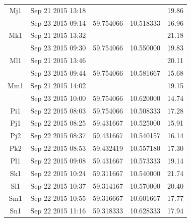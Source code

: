 \documentclass[12pt,a4paper,english]{article}
\begin{document}
\begin{table}[tb]
{\begin{tabular}{|c|c|c|c|c|}
Mj1 & Sep 21 2015 13:18 &           &           & 19.86 \vspace{-0.2cm} \\ 
    & Sep 23 2015 09:14 & 59.754066 & 10.518333 & 16.96\\ \hline
Mk1 & Sep 21 2015 13:32 &           &           & 21.18 \vspace{-0.2cm} \\ 
    & Sep 23 2015 09:30 & 59.754066 & 10.550000 & 19.83\\ \hline
Ml1 & Sep 21 2015 13:46 &           &           & 20.11 \vspace{-0.2cm} \\ 
    & Sep 23 2015 09:44 & 59.754066 & 10.581667 & 15.68\\ \hline
Mm1 & Sep 21 2015 14:02 &           &           & 19.15 \vspace{-0.2cm} \\ 
    & Sep 23 2015 10:00 & 59.754066 & 10.620000 & 14.74\\ \hline
Pi1 & Sep 22 2015 08:03 & 59.754066 & 10.508333 & 17.28\\ \hline
Pj1 & Sep 22 2015 08:25 & 59.431667 & 10.525000 & 15.91\\ \hline
Pj2 & Sep 22 2015 08:37 & 59.431667 & 10.540157 & 16.14\\ \hline
Pk2 & Sep 22 2015 08:53 & 59.432419 & 10.557180 & 17.30\\ \hline
Pl1 & Sep 22 2015 09:08 & 59.431667 & 10.573333 & 19.14\\ \hline
Sk1 & Sep 22 2015 10:24 & 59.311667 & 10.540000 & 21.74\\ \hline
Sl1 & Sep 22 2015 10:37 & 59.314167 & 10.570000 & 20.40\\ \hline
Sm1 & Sep 22 2015 10:55 & 59.316667 & 10.601667 & 17.77\\ \hline
Sn1 & Sep 22 2015 11:16 & 59.318333 & 10.628333 & 17.94\\ \hline
\end{tabular}}
\end{table}
\end{document}

